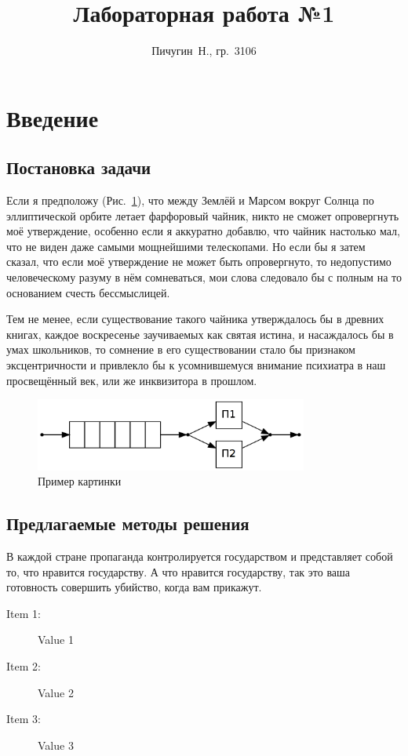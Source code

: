 \documentclass[12pt, a4paper]{article}
\begin{document}
\title{Лабораторная работа №1}
\author{Пичугин~Н., гр.~3106}
\maketitle

\tableofcontents
\newpage

\section{Введение}

\subsection{Постановка задачи}
Если я предположу (Рис.~\ref{fig:sample1}), что между Землёй и Марсом 
вокруг Солнца по эллиптической орбите летает фарфоровый чайник, никто не 
сможет опровергнуть моё утверждение, особенно если я аккуратно добавлю, что 
чайник настолько мал, что не виден даже самыми мощнейшими телескопами. Но 
если бы я затем сказал, что если моё утверждение не может быть 
опровергнуто, то недопустимо человеческому разуму в нём сомневаться, мои 
слова следовало бы с полным на то основанием счесть бессмыслицей.
\par
Тем не менее, если существование такого чайника утверждалось бы в древних 
книгах, каждое воскресенье заучиваемых как святая истина, и насаждалось бы 
в умах школьников, то сомнение в его существовании стало бы признаком 
эксцентричности и привлекло бы к усомнившемуся внимание психиатра в наш 
просвещённый век, или же инквизитора в прошлом.

\begin{figure}[h]
    \centering
    \includegraphics[width=0.8\textwidth]{sample1.png}
    \caption{Пример картинки}
    \label{fig:sample1}
\end{figure}

\subsection{Предлагаемые методы решения}
В каждой стране пропаганда контролируется государством и представляет 
собой то, что нравится государству. А что нравится государству, так это 
ваша готовность совершить убийство, когда вам прикажут.
\begin{description}  %
    \item[Item 1:] Value 1
    \item[Item 2:] Value 2
    \item[Item 3:] Value 3
\end{description}
\end{document}
